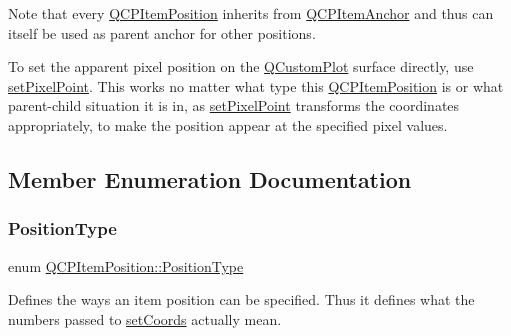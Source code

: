 Note that every \mbox{\hyperlink{class_q_c_p_item_position}{Q\+C\+P\+Item\+Position}} inherits from \mbox{\hyperlink{class_q_c_p_item_anchor}{Q\+C\+P\+Item\+Anchor}} and thus can itself be used as parent anchor for other positions.

To set the apparent pixel position on the \mbox{\hyperlink{class_q_custom_plot}{Q\+Custom\+Plot}} surface directly, use \mbox{\hyperlink{class_q_c_p_item_position_ab404e56d9ac2ac2df0382c57933a71ef}{set\+Pixel\+Point}}. This works no matter what type this \mbox{\hyperlink{class_q_c_p_item_position}{Q\+C\+P\+Item\+Position}} is or what parent-\/child situation it is in, as \mbox{\hyperlink{class_q_c_p_item_position_ab404e56d9ac2ac2df0382c57933a71ef}{set\+Pixel\+Point}} transforms the coordinates appropriately, to make the position appear at the specified pixel values. 

\subsection{Member Enumeration Documentation}
\mbox{\label{class_q_c_p_item_position_aad9936c22bf43e3d358552f6e86dbdc8}} 
\subsubsection{\texorpdfstring{Position\+Type}{PositionType}}
{\footnotesize\ttfamily enum \mbox{\hyperlink{class_q_c_p_item_position_aad9936c22bf43e3d358552f6e86dbdc8}{Q\+C\+P\+Item\+Position\+::\+Position\+Type}}}

Defines the ways an item position can be specified. Thus it defines what the numbers passed to \mbox{\hyperlink{class_q_c_p_item_position_aa988ba4e87ab684c9021017dcaba945f}{set\+Coords}} actually mean.

